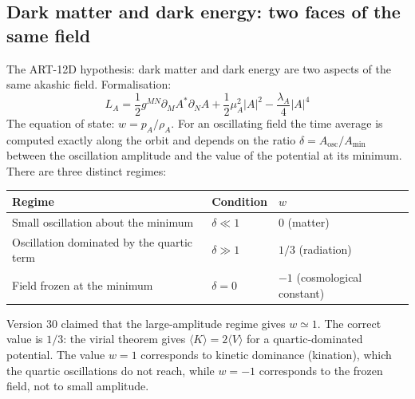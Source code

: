 \subsection{Dark matter and dark energy: two faces of the same field}
The ART-12D hypothesis: dark matter and dark energy are two aspects of the same akashic field. Formalisation:
\begin{equation}
L_A = \frac{1}{2} g^{MN} \partial_M A^* \partial_N A + \frac{1}{2} \mu_A^2 |A|^2 - \frac{\lambda_A}{4} |A|^4
\end{equation}
The equation of state: $w = p_A / \rho_A$. For an oscillating field the time average is computed exactly along the orbit and depends on the ratio $\delta = A_{\text{osc}}/A_{\min}$ between the oscillation amplitude and the value of the potential at its minimum. There are three distinct regimes:
\begin{center}
\begin{tabular}{@{}lll@{}}
\toprule
\textbf{Regime} & \textbf{Condition} & $w$ \\ \midrule
Small oscillation about the minimum & $\delta \ll 1$ & $0$ (matter) \\
Oscillation dominated by the quartic term & $\delta \gg 1$ & $1/3$ (radiation) \\
Field frozen at the minimum & $\delta = 0$ & $-1$ (cosmological constant) \\ \bottomrule
\end{tabular}
\end{center}
Version 30 claimed that the large-amplitude regime gives $w \simeq 1$. The correct value is $1/3$: the virial theorem gives $\langle K \rangle = 2\langle V \rangle$ for a quartic-dominated potential. The value $w = 1$ corresponds to kinetic dominance (kination), which the quartic oscillations do not reach, while $w = -1$ corresponds to the frozen field, not to small amplitude.
